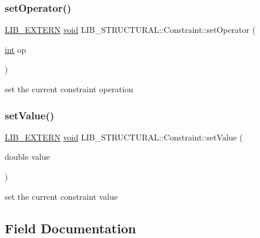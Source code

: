 \subsubsection{\texorpdfstring{set\+Operator()}{setOperator()}}
{\footnotesize\ttfamily \hyperlink{libutil_8h_a48cc004c21e097c0d7c1c5fa8dc03b96}{L\+I\+B\+\_\+\+E\+X\+T\+E\+RN} \hyperlink{lp__lib_8h_ac7828c7b2b31d2e11af17bdb6289c5d9}{void} L\+I\+B\+\_\+\+S\+T\+R\+U\+C\+T\+U\+R\+A\+L\+::\+Constraint\+::set\+Operator (\begin{DoxyParamCaption}\item[{\hyperlink{lp__lib_8h_adeb9ec6400320e4923ac9d836d509ddb}{int}}]{op }\end{DoxyParamCaption})\hspace{0.3cm}{\ttfamily [inline]}}



set the current constraint operation 

\mbox{\label{class_l_i_b___s_t_r_u_c_t_u_r_a_l_1_1_constraint_a59e1f3235dd18b386bd361e04046c421}} 
\subsubsection{\texorpdfstring{set\+Value()}{setValue()}}
{\footnotesize\ttfamily \hyperlink{libutil_8h_a48cc004c21e097c0d7c1c5fa8dc03b96}{L\+I\+B\+\_\+\+E\+X\+T\+E\+RN} \hyperlink{lp__lib_8h_ac7828c7b2b31d2e11af17bdb6289c5d9}{void} L\+I\+B\+\_\+\+S\+T\+R\+U\+C\+T\+U\+R\+A\+L\+::\+Constraint\+::set\+Value (\begin{DoxyParamCaption}\item[{double}]{value }\end{DoxyParamCaption})\hspace{0.3cm}{\ttfamily [inline]}}



set the current constraint value 



\subsection{Field Documentation}
\mbox{\label{class_l_i_b___s_t_r_u_c_t_u_r_a_l_1_1_constraint_af3568c8ace43d617c795ff89e3fd2b29}} 
